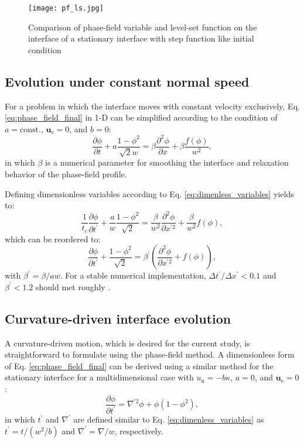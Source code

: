 \begin{figure}
\centering
\medskip
\texttt{[image: pf\_ls.jpg]}
\caption[Comparison of phase-field variable and level-set function]{Comparison of phase-field variable and level-set function on the interface of a stationary interface with step function like initial condition \cite{Sun2007}}
\label{fig:fig:pf_ls}
\end{figure}


\subsection{Evolution under constant normal speed}

For a problem in which the interface moves with constant velocity exclusively, Eq. \ref{eq:phase_field_final} in 1-D can be simplified according to the condition of $a=\text{const.}$, $\boldsymbol{u}_{\mathrm{e}}=0$, and $b=0$:
\begin{equation}
\frac{\partial \phi}{\partial t}+a \frac{1-\phi^{2}}{\sqrt{2} w}=\beta \frac{\partial^{2} \phi}{\partial x} + \beta\frac{f(\phi)}{w^{2}},
\end{equation}
in which $\beta$ is a numerical parameter for smoothing the interface and relaxation behavior of the phase-field profile.

Defining dimensionless variables according to Eq. \ref{eq:dimenless_variables} yields to:
\begin{equation}
\frac{1}{t_c}\frac{\partial \phi}{\partial t^{\prime}}+\frac{a}{w} \frac{1-\phi^{2}}{\sqrt{2}}=\frac{\beta}{w^2} \frac{\partial^{2} \phi}{\partial x^{\prime 2}} + \frac{\beta}{w^{2}}f(\phi),
\end{equation}
which can be reordered to:
\begin{equation}
\frac{\partial \phi}{\partial t^{\prime}}+\frac{1-\phi^{2}}{\sqrt{2}}=\beta^{\prime}\left( \frac{\partial^{2} \phi}{\partial x^{\prime 2}} + f(\phi)\right),
\end{equation}
with $\beta^{\prime}=\beta/aw$. For a stable numerical implementation, $\Delta t^{\prime}/\Delta x^{\prime} < 0.1$ and $\beta^{\prime} < 1.2$ should met roughly \cite{Sun2007}.


\subsection{Curvature-driven interface evolution}

A curvature-driven motion, which is desired for the current study, is straightforward to formulate using the phase-field method. A dimensionless form of Eq. \ref{eq:phase_field_final} can be derived using a similar method for the stationary interface for a multidimensional case with $u_{\mathrm{n}}=-b\kappa$, $a=0$, and $\boldsymbol{u}_{\mathrm{e}}=0$:
\begin{equation} \label{eq:pf_curvature}
\frac{\partial \phi}{\partial t^{\prime}}=\nabla^{\prime 2} \phi+\phi\left(1-\phi^{2}\right),
\end{equation}
in which $t^{\prime}$ and $\nabla^{\prime}$ are defined similar to Eq. \ref{eq:dimenless_variables} as $t^{\prime}=t/(w^2/b)$ and $\nabla^{\prime}=\nabla/w$, respectively.

